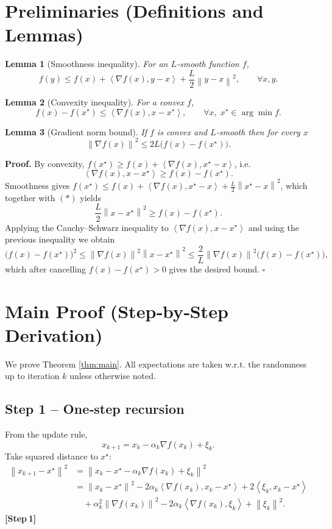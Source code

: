 \documentclass{article}
\newtheorem{lemma}{Lemma}
\newcommand{\norm}[1]{\left\lVert #1\right\rVert}
\newcommand{\ip}[2]{\left\langle #1,#2\right\rangle}
\begin{document}
\newpage
\section*{Preliminaries (Definitions and Lemmas)}
\begin{lemma}[Smoothness inequality]\label{lem:smooth}
For an $L$‑smooth function $f$,
\[
f(y)\le f(x)+\ip{\nabla f(x)}{y-x}+\frac{L}{2}\norm{y-x}^{2},\qquad\forall x,y.
\]
\end{lemma}
\begin{lemma}[Convexity inequality]\label{lem:conv}
For a convex $f$,
\[
f(x)-f(x^\star)\le\ip{\nabla f(x)}{x-x^\star},\qquad \forall x,\;x^\star\in\arg\min f.
\]
\end{lemma}
\begin{lemma}[Gradient norm bound]\label{lem:gradnorm}
If $f$ is convex and $L$‑smooth then for every $x$
\[
\norm{\nabla f(x)}^{2}\le 2L\bigl(f(x)-f(x^\star)\bigr).
\]
\end{lemma}
\textbf{Proof.} By convexity,
$f(x^\star)\ge f(x)+\ip{\nabla f(x)}{x^\star-x}$, i.e.
\[
\ip{\nabla f(x)}{x-x^\star}\ge f(x)-f(x^\star).
\tag{*}
\]
Smoothness gives $f(x^\star)\le f(x)+\ip{\nabla f(x)}{x^\star-x}+\frac{L}{2}\norm{x^\star-x}^{2}$,
which together with $(*)$ yields
\[
\frac{L}{2}\norm{x-x^\star}^{2}\ge f(x)-f(x^\star).
\]
Applying the Cauchy–Schwarz inequality to $\ip{\nabla f(x)}{x-x^\star}$ and using the previous inequality we obtain
\[
\bigl(f(x)-f(x^\star)\bigr)^{2}
\le \norm{\nabla f(x)}^{2}\norm{x-x^\star}^{2}
\le \frac{2}{L}\norm{\nabla f(x)}^{2}\bigl(f(x)-f(x^\star)\bigr),
\]
which after cancelling $f(x)-f(x^\star)>0$ gives the desired bound. $\square$

\section*{Main Proof (Step‑by‑Step Derivation)}
We prove Theorem \ref{thm:main}.  
All expectations are taken w.r.t. the randomness up to iteration $k$ unless otherwise noted.

\subsection*{Step 1 – One‑step recursion}
From the update rule,
\[
x_{k+1}=x_k-\alpha_k\nabla f(x_k)+\xi_k .
\]
Take squared distance to $x^\star$:
\[
\begin{aligned}
\norm{x_{k+1}-x^\star}^{2}
&=\norm{x_k-x^\star-\alpha_k\nabla f(x_k)+\xi_k}^{2}\\
&=\norm{x_k-x^\star}^{2}
-2\alpha_k\ip{\nabla f(x_k)}{x_k-x^\star}
+2\ip{\xi_k}{x_k-x^\star}\\
&\quad+\alpha_k^{2}\norm{\nabla f(x_k)}^{2}
-2\alpha_k\ip{\nabla f(x_k)}{\xi_k}
+\norm{\xi_k}^{2}. \tag{1}
\end{aligned}
\]
\textbf{[Step 1]}
\end{document}

